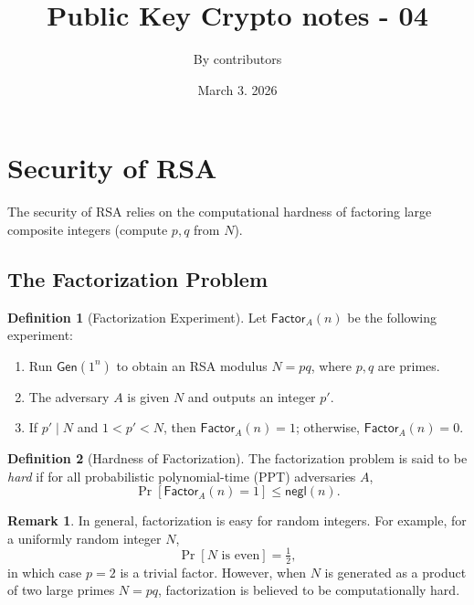 \documentclass[11pt]{article}
\theoremstyle{definition}
\newtheorem{definition}{Definition}[section]
\newtheorem{remark}{Remark}[section]
\theoremstyle{proof}
\newcommand{\Gen}{\mathsf{Gen}}
\newcommand{\negl}{\mathsf{negl}}
\begin{document}
	
	\title{Public Key Crypto notes - 04}
	\author{By contributors}
	\date{March 3. 2026}
	\maketitle
	
	\section{Security of RSA}
	
	The security of RSA relies on the computational hardness of factoring large
	composite integers (compute $p, q$ from $N$).
	
	\subsection{The Factorization Problem}
	
	\begin{definition}[Factorization Experiment]
		\leavevmode
		Let $\mathsf{Factor}_A(n)$ be the following experiment:
		\begin{enumerate}
			\item Run $\Gen(1^n)$ to obtain an RSA modulus $N = pq$, where $p,q$ are primes.
			\item The adversary $A$ is given $N$ and outputs an integer $p'$.
			\item If $p' \mid N$ and $1 < p' < N$, then $\mathsf{Factor}_A(n) = 1$;
			otherwise, $\mathsf{Factor}_A(n) = 0$.
		\end{enumerate}
	\end{definition}
	
	\begin{definition}[Hardness of Factorization]
		The factorization problem is said to be \emph{hard} if for all probabilistic
		polynomial-time (PPT) adversaries $A$,
		$$
		\Pr[\mathsf{Factor}_A(n) = 1] \leq \negl(n).
		$$
	\end{definition}
	
	\begin{remark}
		In general, factorization is easy for random integers.
		For example, for a uniformly random integer $N$,
		$$
		\Pr[N \text{ is even}] = \tfrac{1}{2},
		$$
		in which case $p = 2$ is a trivial factor.
		However, when $N$ is generated as a product of two large primes
		$N = pq$, factorization is believed to be computationally hard.
	\end{remark}
	
\end{document}
